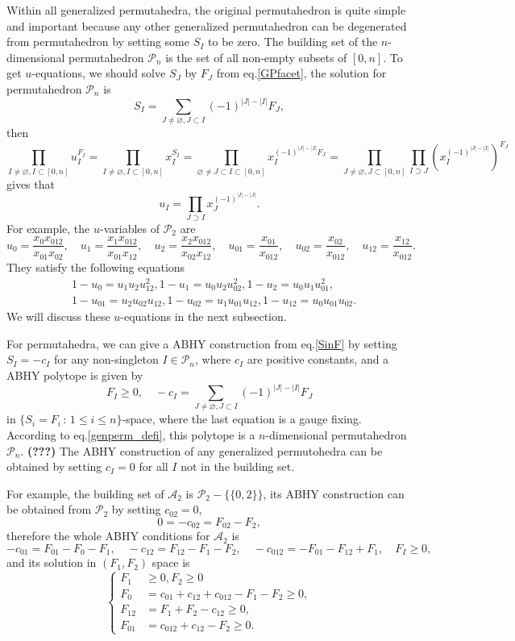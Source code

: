 \documentclass[hidelinks,12pt]{article}
\begin{document}
Within all generalized permutahedra, the original permutahedron is quite simple
and important because any other generalized permutahedron can be degenerated from
permutahedron by setting some $S_I$ to be zero.
The building set of the $n$-dimensional permutahedron $\mathscr P_n$ is 
the set of all non-empty subsets of $[0,n]$. 
To get $u$-equations, we should solve $S_J$ by $F_J$ from eq.\eqref{GPfacet}, the 
solution for permutahedron $\mathscr P_n$ is 
\begin{equation}\label{SinF}
	S_I=\sum_{J\neq \varnothing,J\subset I} (-1)^{|J|-|I|}F_J,
\end{equation}
then
\[
	\prod_{I\neq \varnothing,I\subset [0,n]}u_I^{F_I}=
	\prod_{I\neq \varnothing,I\subset [0,n]}x_I^{S_I}=
	\prod_{\varnothing\neq J\subset I\subset [0,n]}
	x_I^{(-1)^{|J|-|I|}F_J}=
	\prod_{J\neq \varnothing,J\subset [0,n]}
	\prod_{I\supset J}(x_I^{(-1)^{|J|-|I|}})^{F_J}
\]
gives that
\[
	u_I=\prod_{J\supset I}x_J^{(-1)^{|I|-|J|}}.
\]
For example, the $u$-variables of $\mathscr P_2$ are
\[
	u_{0}  = \frac{x_0 x_{012}}{x_{01}x_{02}},\quad 
	u_{1}  = \frac{x_1 x_{012}}{x_{01}x_{12}},\quad
	u_{2}  = \frac{x_2 x_{012}}{x_{02}x_{12}},\quad
	u_{01} = \frac{x_{01}}{x_{012}},\quad 
	u_{02} = \frac{x_{02}}{x_{012}},\quad
	u_{12} = \frac{x_{12}}{x_{012}}.
\]
They satisfy the following equations
\begin{align*}
	&1-u_{0}=u_{1} u_{2} u_{12}^2,
	1-u_{1}=u_{0} u_{2} u_{02}^2,
	1-u_{2}=u_{0} u_{1} u_{01}^2,\\
	&1-u_{01}=u_{2} u_{02} u_{12},
	1-u_{02}=u_{1} u_{01} u_{12},
	1-u_{12}=u_{0} u_{01} u_{02}.
\end{align*}
We will discuss these $u$-equations in the next subsection.

For permutahedra, we can give a ABHY construction from eq.\eqref{SinF} by setting 
$S_I=-c_I$ for any non-singleton $I\in \mathscr P_n$, where $c_I$ are positive 
constants, and a ABHY polytope is given by 
\begin{equation}\label{ABHY}
	F_I\geq 0,\quad -c_I=\sum_{J\neq \varnothing,J\subset I}(-1)^{|J|-|I|}F_J
\end{equation}
in $\{S_i=F_i\,:\,1\leq i\leq n\}$-space, where the last equation is a gauge fixing. 
According to eq.\eqref{genperm_defi}, this polytope is a $n$-dimensional 
permutahedron $\mathscr P_n$. {\bf (???)}
The ABHY construction of any generalized permutohedra can be obtained by 
setting $c_I=0$ for all $I$ not in the building set.

For example, the building set of $\mathscr A_2$ is $\mathscr P_2-\{\{0,2\}\}$,
its ABHY construction can be obtained from $\mathscr P_2$ by setting $c_{02}=0$, 
\[
	0=-c_{02}=F_{02}-F_2,
\]
therefore the whole ABHY conditions for $\mathscr A_2$ is 
\[
	-c_{01}=F_{01}-F_0-F_1,\quad -c_{12}=F_{12}-F_1-F_2,\quad 
	-c_{012}=-F_{01}-F_{12}+F_1,\quad F_I\geq 0,
\]
and its solution in $(F_1,F_2)$ space is 
\[
	\left\{\begin{aligned}
		F_1&\geq 0,F_2\geq 0\\
		F_0&=c_{01}+c_{12}+c_{012}-F_1-F_2\geq 0,\\
		F_{12}&=F_1+F_2-c_{12}\geq 0,\\
		F_{01}&=c_{012}+c_{12}-F_2\geq 0.
	\end{aligned}\right.
\]
\end{document}
